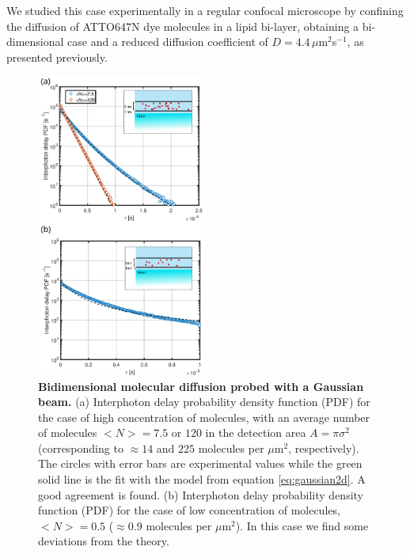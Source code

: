 We studied this case experimentally in a regular confocal microscope 
by confining the diffusion of ATTO647N dye molecules in a lipid bi-layer, 
obtaining a bi-dimensional case and a reduced diffusion coefficient of 
$D=4.4\, \mu$m$^2$s$^{-1}$, as presented previously\cite{pradhan2016goldnanorodenhanced}. 

\begin{figure}
\centering
\includegraphics[width=0.5\textwidth]{2D_gaussian_with_single}%
\caption{\textbf{Bidimensional molecular diffusion probed with a Gaussian beam.} 
(a) Interphoton delay probability density function (PDF) for the case 
of high concentration of molecules, with an average
number of molecules $<N>=7.5$ or $120$ in the detection area 
$A=\pi\sigma^2$ (corresponding to $\approx 14$ and $225$ molecules 
per $\mu$m$^2$, respectively). The circles with error bars are 
experimental values while the green solid line is 
the fit with the model from equation \ref{eq:gaussian2d}. 
A good agreement is found. (b) Interphoton delay probability 
density function (PDF) for the case of low concentration
of molecules, $<N>=0.5$ ($\approx 0.9$ molecules per $\mu$m$^2$). 
In this case we find some deviations
from the theory. 
\label{fg:gaussian2d}}
\end{figure}

